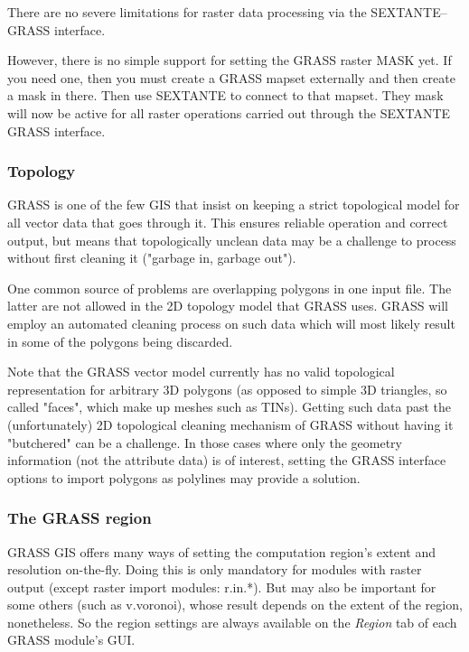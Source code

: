 There are no severe limitations for raster data processing via the SEXTANTE--GRASS interface.

However, there is no simple support for setting the GRASS raster MASK yet. If you need one, then you must create a GRASS mapset externally and then create a mask in there. Then use SEXTANTE to connect to that mapset. They mask will now be active for all raster operations carried out through the SEXTANTE GRASS interface.

\subsubsection{Topology}

GRASS is one of the few GIS that insist on keeping a strict topological model for all vector data that goes through it. This ensures reliable operation and correct output, but means that topologically unclean data may be a challenge to process without first cleaning it ("garbage in, garbage out").

One common source of problems are overlapping polygons in one input file. The latter are not allowed in the 2D topology model that GRASS uses. GRASS will employ an automated cleaning process on such data which will most likely result in some of the polygons being discarded.

Note that the GRASS vector model currently has no valid topological representation for arbitrary 3D polygons (as opposed to simple 3D triangles, so called "faces", which make up meshes such as TINs). Getting such data past the (unfortunately) 2D topological cleaning mechanism of GRASS without having it "butchered" can be a challenge. In those cases where only the geometry information (not the attribute data) is of interest, setting the GRASS interface options to import polygons as polylines may provide a solution.

\subsubsection{The GRASS region}

GRASS GIS offers many ways of setting the computation region's extent and resolution on-the-fly. Doing this is only mandatory for modules with raster output (except raster import modules: r.in.*). But may also be important for some others (such as v.voronoi), whose result depends on the extent of the region, nonetheless. So the region settings are always available on the \emph{Region} tab of each GRASS module's GUI.

